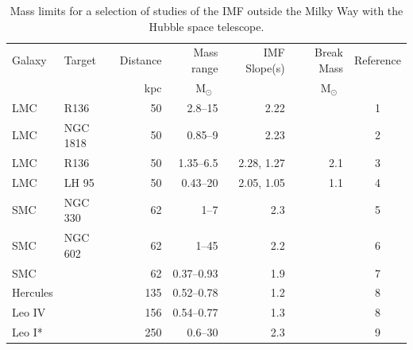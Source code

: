 \documentclass{aa}
\newcommand{\msun}{M$_\odot$~}
\begin{document}
\begin{table}

    \centering
    \caption{Mass limits for a selection of studies of the IMF outside the Milky Way with the Hubble space telescope. }
    \label{tbl:imf_lit_review}

    \begin{tabular}{ l l r r r r c }
        \hline
        \hline
        Galaxy   &  Target      &  Distance &  Mass range       & IMF Slope(s) & Break Mass          & Reference         \\
                &               & kpc       & \msun             &              & \msun               &                   \\
        \hline
        LMC      &  R136        & 50        & 2.8--15            & 2.22         &                     & 1 \\
        LMC      &  NGC 1818    & 50        & 0.85--9            & 2.23         &                     & 2  \\
        LMC      &  R136        & 50        & 1.35--6.5          & 2.28, 1.27   & 2.1                 & 3     \\
        LMC      &  LH 95       & 50        & 0.43--20           & 2.05, 1.05   & 1.1                 & 4      \\
        \hline
        SMC      &  NGC 330     & 62        & 1--7               & 2.3          &                     & 5    \\
        SMC      &  NGC 602     & 62        & 1--45              & 2.2          &                     & 6     \\
        SMC      &              & 62        & 0.37--0.93         & 1.9          &                     & 7     \\
        \hline
        Hercules &              & 135       & 0.52--0.78         & 1.2          &                     & 8         \\
        Leo IV   &              & 156       & 0.54--0.77         & 1.3          &                     & 8         \\
        Leo I*   &              & 250       & 0.6--30            & 2.3          &                     & 9     \\
        \hline
        \end{tabular}


\end{table}
\end{document}
